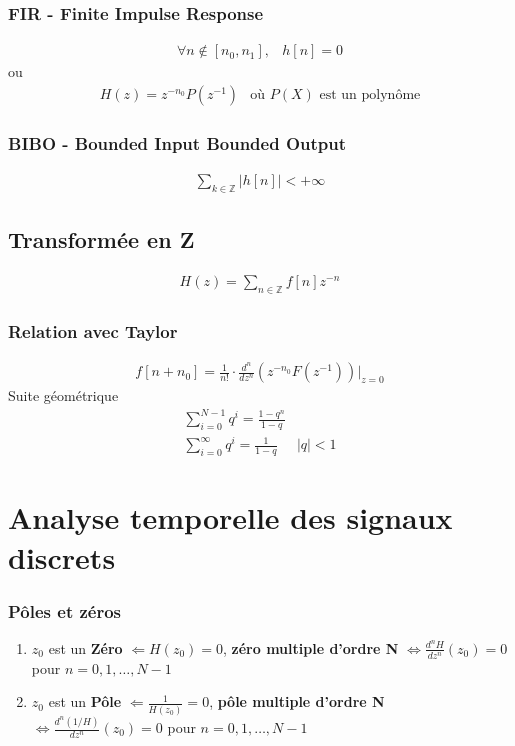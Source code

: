 \documentclass[a4paper]{amsart}
\begin{document}
\subsubsection{FIR - Finite Impulse Response}
\begin{eqnarray}
	\forall n \notin [n_0,n_1],&h[n]=0
\end{eqnarray}
ou 
\begin{eqnarray}
	H(z)=z^{-n_0}P(z^{-1}) &\text{où $P(X)$ est un polynôme}
\end{eqnarray}
\subsubsection{BIBO - Bounded Input Bounded Output}
\begin{eqnarray}
	\sum_{k\in\mathbb Z}|h[n]|<+\infty
\end{eqnarray}
\subsection{Transformée en Z}
\begin{eqnarray}
	H(z)=\sum_{n\in\mathbb Z}f[n]z^{-n}
\end{eqnarray}
\subsubsection{Relation avec Taylor}
\begin{eqnarray}
	f[n+n_0]=\frac{1}{n!}\cdot\frac{d^n}{dz^n}\left(z^{-n_0}F(z^{-1})\right)\big|_{z=0}
\end{eqnarray}
Suite géométrique
\begin{eqnarray}
	\sum_{i=0}^{N-1}q^i=\frac{1-q^n}{1-q}\\
	\sum_{i=0}^{\infty}q^i=\frac{1}{1-q}	& |q|<1
\end{eqnarray}
\section{Analyse temporelle des signaux discrets}
\subsubsection{Pôles et zéros}
\begin{enumerate}
	\item $z_0$ est un \textbf{Zéro} $\Leftarrow H(z_0)=0$, \textbf{zéro multiple d'ordre N} $\Leftrightarrow \frac{d^nH}{dz^n}(z_0)=0$ pour $n=0,1,\dots,N-1$\\
	\item $z_0$ est un \textbf{Pôle} $\Leftarrow \frac{1}{H(z_0)}=0$, \textbf{pôle multiple d'ordre N} $\Leftrightarrow \frac{d^n(1/H)}{dz^n}(z_0)=0$ pour $n=0,1,\dots,N-1$\\
\end{enumerate}
\end{document}
